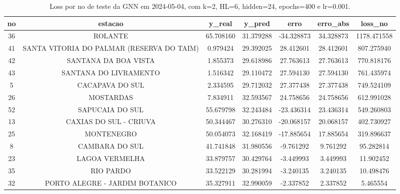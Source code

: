 \begin{table}[h]
\centering
\caption{Loss por no de teste da GNN em 2024-05-04, com k=2, HL=6, hidden=24, epochs=400 e lr=0.001.}
\label{tab:gnn_loss_k2_hl6_h24_e400_d20240504}
\begin{tabular}{ccccccc}
\toprule
no & estacao & y\_real & y\_pred & erro & erro\_abs & loss\_no \\
\midrule
36 & ROLANTE & 65.708160 & 31.379288 & -34.328873 & 34.328873 & 1178.471558 \\
41 & SANTA VITORIA DO PALMAR (RESERVA DO TAIM) & 0.979424 & 29.392025 & 28.412601 & 28.412601 & 807.275940 \\
42 & SANTANA DA BOA VISTA & 1.855373 & 29.618986 & 27.763613 & 27.763613 & 770.818176 \\
43 & SANTANA DO LIVRAMENTO & 1.516342 & 29.110472 & 27.594130 & 27.594130 & 761.435974 \\
5 & CACAPAVA DO SUL & 2.334595 & 29.712032 & 27.377438 & 27.377438 & 749.524109 \\
26 & MOSTARDAS & 7.834911 & 32.593567 & 24.758656 & 24.758656 & 612.991028 \\
52 & SAPUCAIA DO SUL & 55.679798 & 32.243484 & -23.436314 & 23.436314 & 549.260803 \\
13 & CAXIAS DO SUL - CRIUVA & 50.344467 & 30.276310 & -20.068157 & 20.068157 & 402.730927 \\
25 & MONTENEGRO & 50.054073 & 32.168419 & -17.885654 & 17.885654 & 319.896637 \\
8 & CAMBARA DO SUL & 41.741848 & 31.980556 & -9.761292 & 9.761292 & 95.282814 \\
23 & LAGOA VERMELHA & 33.879757 & 30.429764 & -3.449993 & 3.449993 & 11.902452 \\
35 & RIO PARDO & 33.522129 & 30.281994 & -3.240135 & 3.240135 & 10.498476 \\
32 & PORTO ALEGRE - JARDIM BOTANICO & 35.327911 & 32.990059 & -2.337852 & 2.337852 & 5.465554 \\
\bottomrule
\end{tabular}
\end{table}
